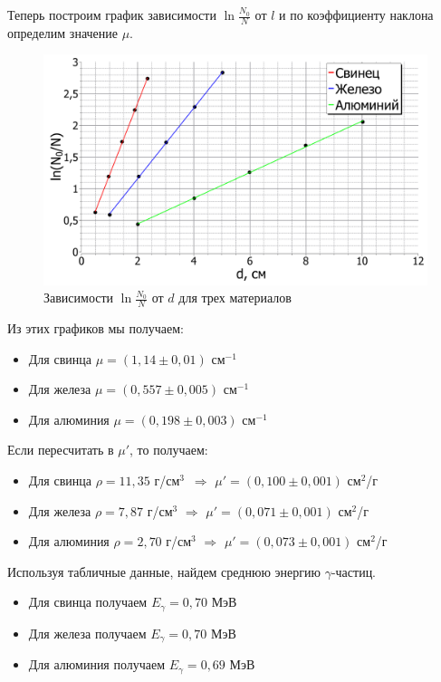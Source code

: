 	\newpage
	Теперь построим график зависимости $\ln \frac{N_0}{N}$ от $l$ и по коэффициенту наклона определим значение $\mu$.
	
	\begin{figure}[h!]
		\centering
		\includegraphics[width=\linewidth]{Pictures/Plot.pdf}
		\caption{Зависимости $\ln \frac{N_0}{N}$ от $d$ для трех материалов}
	\end{figure}

	Из этих графиков мы получаем:
	\begin{itemize}
		\item Для свинца $\mu = (1,14 \pm 0,01)$ см$^{-1}$
		
		\item Для железа $\mu = (0,557 \pm 0,005)$ см$^{-1}$
		
		\item Для алюминия $\mu = (0,198 \pm 0,003)$ см$^{-1}$
	\end{itemize}
	Если пересчитать в $\mu'$, то получаем:
	\begin{itemize}
		\item Для свинца $\rho = 11,35$ г/см$^3$ \;\;\;\,$\Longrightarrow$ $\mu' = (0,100 \pm 0,001)$ см$^2$/г
		
		\item Для железа $\rho = 7,87$ г/см$^3$ \;\;\;\;\;$\Longrightarrow$ $\mu' = (0,071 \pm 0,001)$ см$^2$/г
		
		\item Для алюминия $\rho = 2,70$ г/см$^3$ $\Longrightarrow$ $\mu' = (0,073 \pm 0,001)$ см$^2$/г
	\end{itemize}

	Используя табличные данные, найдем среднюю энергию $\gamma$-частиц.
	
	\begin{itemize}
		\item Для свинца получаем $E_\gamma = 0,70$ МэВ 
		
		\item Для железа получаем $E_\gamma = 0,70$ МэВ
		
		\item Для алюминия получаем $E_\gamma = 0,69$ МэВ
	\end{itemize}


